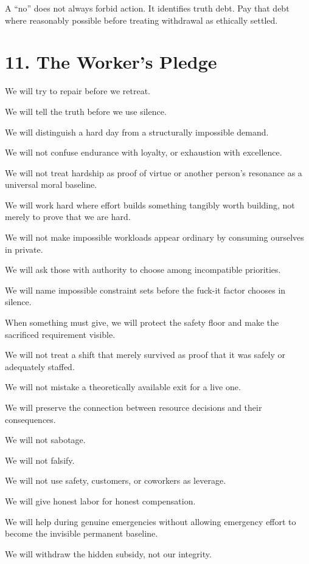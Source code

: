 \documentclass[11pt,oneside]{article}
\begin{document}
A ``no'' does not always forbid action. It identifies truth debt. Pay
that debt where reasonably possible before treating withdrawal as
ethically settled.

\section{11. The Worker's Pledge}\label{the-workers-pledge}

We will try to repair before we retreat.

We will tell the truth before we use silence.

We will distinguish a hard day from a structurally impossible demand.

We will not confuse endurance with loyalty, or exhaustion with
excellence.

We will not treat hardship as proof of virtue or another person's
resonance as a universal moral baseline.

We will work hard where effort builds something tangibly worth building,
not merely to prove that we are hard.

We will not make impossible workloads appear ordinary by consuming
ourselves in private.

We will ask those with authority to choose among incompatible
priorities.

We will name impossible constraint sets before the fuck-it factor
chooses in silence.

When something must give, we will protect the safety floor and make the
sacrificed requirement visible.

We will not treat a shift that merely survived as proof that it was
safely or adequately staffed.

We will not mistake a theoretically available exit for a live one.

We will preserve the connection between resource decisions and their
consequences.

We will not sabotage.

We will not falsify.

We will not use safety, customers, or coworkers as leverage.

We will give honest labor for honest compensation.

We will help during genuine emergencies without allowing emergency
effort to become the invisible permanent baseline.

We will withdraw the hidden subsidy, not our integrity.
\end{document}
